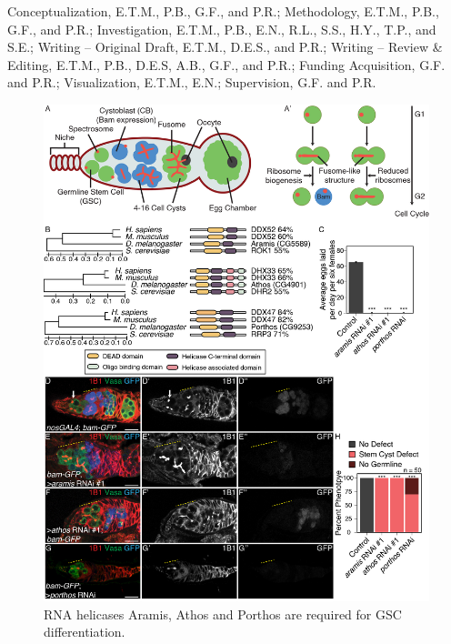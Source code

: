 \documentclass[12pt,oneside]{reedthesis}
\begin{document}
Conceptualization, E.T.M., P.B., G.F., and P.R.; Methodology, E.T.M.,
P.B., G.F., and P.R.; Investigation, E.T.M., P.B., E.N., R.L., S.S.,
H.Y., T.P., and S.E.; Writing -- Original Draft, E.T.M., D.E.S., and
P.R.; Writing -- Review \& Editing, E.T.M., P.B., D.E.S, A.B., G.F., and
P.R.; Funding Acquisition, G.F. and P.R.; Visualization, E.T.M., E.N.;
Supervision, G.F. and P.R.
\begin{figure}

{\centering \includegraphics[width=6.5 in,height=8.9375 in]{./figure/Ribosome Biogenesis/Ribosome Biogenesis 1} 

}

\caption[RNA helicases Aramis, Athos and Porthos are required for GSC differentiation.]{RNA helicases Aramis, Athos and Porthos are required for GSC differentiation.}\label{fig:unnamed-chunk-6}
\end{figure}
\end{document}
